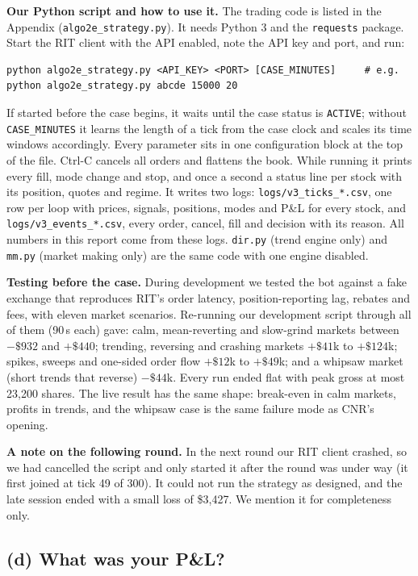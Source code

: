 \documentclass[10pt]{article}
\newcommand{\code}[1]{\texttt{#1}}
\newcommand{\q}[1]{\vspace{4pt}\subsection*{#1}\vspace{-2pt}}
\begin{document}
\textbf{Our Python script and how to use it.} The trading code is listed in the Appendix (\code{algo2e\_strategy.py}). It needs Python 3 and the \code{requests} package. Start the RIT
client with the API enabled, note the API key and port, and run:
\begin{lstlisting}
python algo2e_strategy.py <API_KEY> <PORT> [CASE_MINUTES]     # e.g. python algo2e_strategy.py abcde 15000 20
\end{lstlisting}
If started before the case begins, it waits until the case status is \code{ACTIVE}; without \code{CASE\_MINUTES} it learns the length of a tick from the case clock and scales its time windows
accordingly. Every parameter sits in one configuration block at the top of the file. Ctrl-C cancels all orders and flattens the book. While running it prints every fill, mode change and stop,
and once a second a status line per stock with its position, quotes and regime. It writes two logs: \code{logs/v3\_ticks\_*.csv}, one row per loop with prices, signals, positions, modes and P\&L
for every stock, and \code{logs/v3\_events\_*.csv}, every order, cancel, fill and decision with its reason. All numbers in this report come from these logs.
\code{dir.py} (trend engine only) and \code{mm.py} (market making only) are the same code with one engine disabled.

\textbf{Testing before the case.} During development we tested the bot against a fake exchange that reproduces RIT's order latency, position-reporting lag, rebates and fees, with eleven market scenarios. Re-running our development
script through all of them (90\,s each) gave: calm, mean-reverting and slow-grind markets between $-\$932$ and $+\$440$; trending, reversing and crashing markets $+\$41$k to $+\$124$k; spikes, sweeps
and one-sided order flow $+\$12$k to $+\$49$k; and a whipsaw market (short trends that reverse) $-\$44$k. Every run ended flat with peak gross at most 23{,}200 shares. The live result has the same
shape: break-even in calm markets, profits in trends, and the whipsaw case is the same failure mode as CNR's opening.

\textbf{A note on the following round.} In the next round our RIT client crashed, so we had cancelled the script and only started it after the round was under way (it first joined at tick 49 of 300).
It could not run the strategy as designed, and the late session ended with a small loss of \$3{,}427. We mention it for completeness only.

\q{(d) What was your P\&L?}
\end{document}
